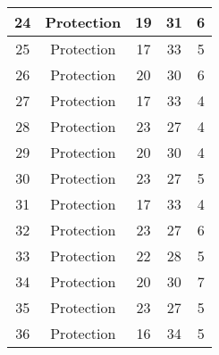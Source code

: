 \documentclass[results.tex]{subfiles}
\begin{document}
\begin{center}
\begin{tabular}{| c || c | c | c | c |}
            \hline
            24                      & Protection                   & 19                     & 31                      & 6                    \\
            \hline
            25                      & Protection                   & 17                     & 33                      & 5                    \\
            \hline
            26                      & Protection                   & 20                     & 30                      & 6                    \\
            \hline
            27                      & Protection                   & 17                     & 33                      & 4                    \\
            \hline
            28                      & Protection                   & 23                     & 27                      & 4                    \\
            \hline
            29                      & Protection                   & 20                     & 30                      & 4                    \\
            \hline
            30                      & Protection                   & 23                     & 27                      & 5                    \\
            \hline
            31                      & Protection                   & 17                     & 33                      & 4                    \\
            \hline
            32                      & Protection                   & 23                     & 27                      & 6                    \\
            \hline
            33                      & Protection                   & 22                     & 28                      & 5                    \\
            \hline
            34                      & Protection                   & 20                     & 30                      & 7                    \\
            \hline
            35                      & Protection                   & 23                     & 27                      & 5                    \\
            \hline
            36                      & Protection                   & 16                     & 34                      & 5                    \\

\end{tabular}
\end{center}
\end{document}
